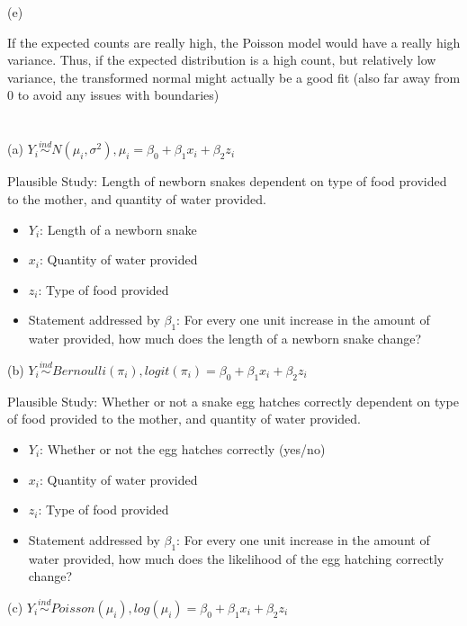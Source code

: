 \documentclass{article}
\begin{document}
(e)

If the expected counts are really high, the Poisson model would have a really high variance. Thus, if the expected distribution is a high count, but relatively low variance, the transformed normal might actually be a good fit (also far away from 0 to avoid any issues with boundaries)



\section{}

(a) $Y_i \overset{ind}{\sim} N(\mu_i, \sigma^2), \mu_i = \beta_0 + \beta_1 x_i + \beta_2 z_i$

Plausible Study: Length of newborn snakes dependent on type of food provided to the mother, and quantity of water provided. 

\begin{itemize}
    \item $Y_i$: Length of a newborn snake
    \item $x_i$: Quantity of water provided
    \item $z_i$: Type of food provided
    \item Statement addressed by $\beta_1$: For every one unit increase in the amount of water provided, how much does the length of a newborn snake change?
\end{itemize}

(b) $Y_i \overset{ind}{\sim} Bernoulli(\pi_i), logit(\pi_i) = \beta_0 + \beta_1 x_i + \beta_2 z_i$

Plausible Study: Whether or not a snake egg hatches correctly dependent on type of food provided to the mother, and quantity of water provided. 

\begin{itemize}
    \item $Y_i$: Whether or not the egg hatches correctly (yes/no)
    \item $x_i$: Quantity of water provided
    \item $z_i$: Type of food provided
    \item Statement addressed by $\beta_1$: For every one unit increase in the amount of water provided, how much does the likelihood of the egg hatching correctly change?
\end{itemize}

(c) $Y_i \overset{ind}{\sim} Poisson(\mu_i), log(\mu_i) = \beta_0 + \beta_1 x_i + \beta_2 z_i$
\end{document}
